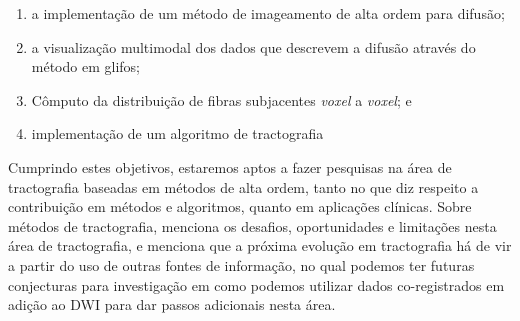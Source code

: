 \documentclass[
    12pt,                %
    oneside,            %
    a4paper,            %
    english,            %
    french,                %
    spanish,            %
    brazil                %
    ]{abntex2}
\begin{document}
\begin{enumerate}
    \item a implementação de um método de imageamento de alta ordem para difusão;
    \item a visualização multimodal dos dados que descrevem a difusão através do método em glifos;
    \item Cômputo da distribuição de fibras subjacentes \textit{voxel} a \textit{voxel}; e
    \item implementação de um algoritmo de tractografia
\end{enumerate}


Cumprindo estes objetivos, estaremos aptos a fazer pesquisas na área de tractografia baseadas em métodos de alta ordem, tanto no que diz respeito a contribuição em métodos e algoritmos, quanto em aplicações clínicas. Sobre métodos de tractografia,  menciona os desafios, oportunidades e limitações nesta área de tractografia, e menciona que a próxima evolução em tractografia há de vir a partir do uso de outras fontes de informação, no qual podemos ter futuras conjecturas para investigação em como podemos utilizar dados co-registrados em adição ao DWI para dar passos adicionais nesta área.






\end{document}
